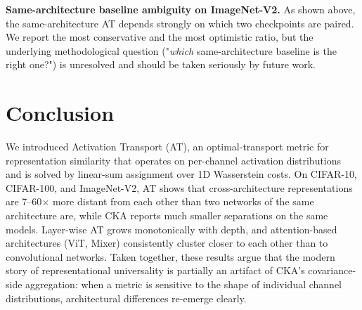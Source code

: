 \documentclass[11pt]{article}
\begin{document}
\textbf{Same-architecture baseline ambiguity on ImageNet-V2.} As shown
above, the same-architecture AT depends strongly on which two
checkpoints are paired. We report the most conservative and the most
optimistic ratio, but the underlying methodological question
("\emph{which} same-architecture baseline is the right one?") is
unresolved and should be taken seriously by future work.

\section{Conclusion}

We introduced Activation Transport (AT), an optimal-transport metric
for representation similarity that operates on per-channel
activation distributions and is solved by linear-sum assignment over
1D Wasserstein costs. On CIFAR-10, CIFAR-100, and ImageNet-V2, AT
shows that cross-architecture representations are 7--60$\times$ more
distant from each other than two networks of the same architecture
are, while CKA reports much smaller separations on the same models.
Layer-wise AT grows monotonically with depth, and attention-based
architectures (ViT, Mixer) consistently cluster closer to each other
than to convolutional networks. Taken together, these results argue
that the modern story of representational universality is partially
an artifact of CKA's covariance-side aggregation: when a metric is
sensitive to the shape of individual channel distributions,
architectural differences re-emerge clearly.
\end{document}

